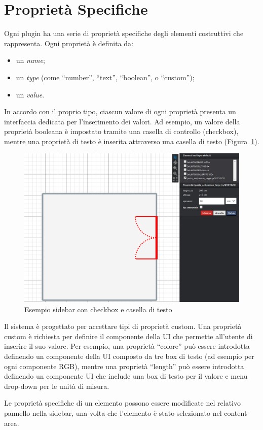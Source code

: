 \section{Propriet\`a Specifiche}
\label{sec:chapter_3_section_3}

\noindent

Ogni plugin ha una serie di proprietà specifiche degli elementi costruttivi che rappresenta.
Ogni propriet\`a \`e definita da:
\begin{itemize}
  \item un \emph{name};
  \item un \emph{type} (come ``number'', ``text'', ``boolean'', o ``custom'');
  \item un \emph{value}.
\end{itemize}
In accordo con il proprio tipo, ciascun valore di ogni proprietà presenta un interfaccia dedicata per l'inserimento dei valori.
Ad esempio, un valore della proprietà booleana è impostato tramite una casella di controllo (checkbox),
mentre una proprietà di testo è inserita attraverso una casella di testo (Figura~\ref{fig:dettaglio}).

\begin{figure}[htbp] %
   \centering
   \includegraphics[width=1\linewidth]{images/dettaglio}
   \caption{Esempio sidebar con checkbox e casella di testo}
   \label{fig:dettaglio}
   \end{figure}
\newpage

Il sistema \`e progettato per accettare tipi di propriet\`a custom. Una propriet\`a custom è richiesta per definire
il componente della UI che permette all'utente di inserire il suo valore.
Per esempio, una propriet\`a ``colore'' pu\`o essere introdotta definendo un componente della UI composto da tre box di testo
(ad esempio per ogni componente RGB), mentre una propriet\`a ``length'' pu\`o essere introdotta definendo un componente UI
che include una box di testo per il valore e menu drop-down per le unità di misura.

Le propriet\`a specifiche di un elemento possono essere modificate nel relativo pannello nella sidebar, una volta che l'elemento
\`e stato selezionato nel content-area.
